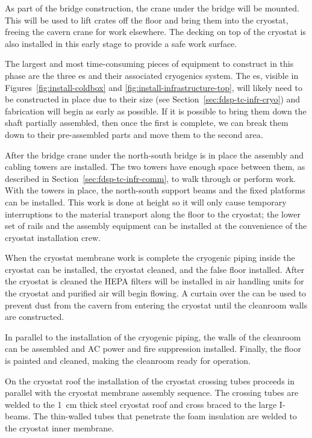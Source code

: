 As part of the bridge construction, the crane under the bridge will be mounted. This 
will be used to lift crates off the floor and bring them into the cryostat, freeing the cavern crane for work elsewhere. The decking on top of the cryostat is also installed in this early stage to provide a safe work surface. 

The largest and most time-consuming pieces of equipment to  construct in this phase are the three \coldbox{}es and their associated cryogenics system. 
The \coldbox{}es, visible in Figures~\ref{fig:install-coldbox} and \ref{fig:install-infrastructure-top}, will likely need to be constructed in place due to their size (see Section~\ref{sec:fdsp-tc-infr-cryo}) and fabrication will begin as early as possible.  
If it is possible to bring them down the shaft partially assembled, then once the first  is complete, we can break them down to their pre-assembled parts and move them to the second  area.

 
After the bridge crane under the north-south bridge is in place the  assembly and cabling towers are installed. 
The two towers have enough space between them, as described in Section~\ref{sec:fdsp-tc-infr-comm}, to walk through or perform work. 
With the towers in place, the north-south support beams and the fixed platforms can be installed. 
This work is done at height so it will only cause temporary interruptions to the material transport along the floor to the cryostat; the lower set of rails and the  assembly equipment can be installed at the convenience of the cryostat installation crew.

When the cryostat membrane work is complete the cryogenic piping inside the cryostat can be installed, the cryostat cleaned, and the false floor installed. After the cryostat is cleaned the HEPA filters will be installed in air handling units for the cryostat and purified air will begin flowing. A curtain over the  can be used to prevent dust from the cavern from entering the cryostat until the cleanroom walls are constructed.

In parallel to the installation of the cryogenic piping, the walls of the cleanroom can be assembled and AC power and fire suppression installed. Finally, the floor is painted and 
cleaned, making the cleanroom ready for operation.



On the cryostat roof the installation of the cryostat crossing tubes proceeds in parallel with the cryostat membrane assembly sequence. 
The crossing tubes are welded to the \SI{1}{cm} thick steel cryostat roof and cross braced to the large I-beams. 
The thin-walled tubes that penetrate the foam insulation are welded to the cryostat inner membrane.


